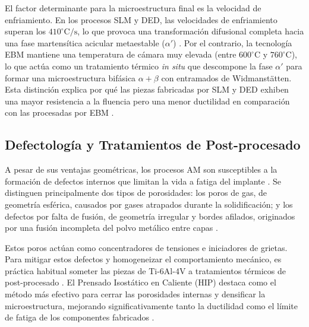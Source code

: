 El factor determinante para la microestructura final es la velocidad de enfriamiento. En los procesos SLM y DED, las velocidades de enfriamiento superan los $410^\circ\text{C/s}$, lo que provoca una transformación difusional completa hacia una fase martensítica acicular metaestable ($\alpha'$) \cite{nguyen2022critical}. Por el contrario, la tecnología EBM mantiene una temperatura de cámara muy elevada (entre $600^\circ\text{C}$ y $760^\circ\text{C}$), lo que actúa como un tratamiento térmico \textit{in situ} que descompone la fase $\alpha'$ para formar una microestructura bifásica $\alpha+\beta$ con entramados de Widmanstätten. Esta distinción explica por qué las piezas fabricadas por SLM y DED exhiben una mayor resistencia a la fluencia pero una menor ductilidad en comparación con las procesadas por EBM \cite{neikter2018microstructural,zhai2016microstructure}.

\subsection{Defectología y Tratamientos de Post-procesado}
A pesar de sus ventajas geométricas, los procesos AM son susceptibles a la formación de defectos internos que limitan la vida a fatiga del implante \cite{zhai2016microstructure}. Se distinguen principalmente dos tipos de porosidades: los poros de gas, de geometría esférica, causados por gases atrapados durante la solidificación; y los defectos por falta de fusión, de geometría irregular y bordes afilados, originados por una fusión incompleta del polvo metálico entre capas \cite{nguyen2022critical}.

Estos poros actúan como concentradores de tensiones e iniciadores de grietas. Para mitigar estos defectos y homogeneizar el comportamiento mecánico, es práctica habitual someter las piezas de Ti-6Al-4V a tratamientos térmicos de post-procesado \cite{zhai2016microstructure}. El Prensado Isostático en Caliente (HIP) destaca como el método más efectivo para cerrar las porosidades internas y densificar la microestructura, mejorando significativamente tanto la ductilidad como el límite de fatiga de los componentes fabricados \cite{nguyen2022critical}.